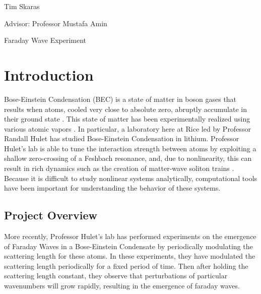 \documentclass[12]{article}
\begin{document}
\begin{flushright}
Tim Skaras

Advisor: Professor Mustafa Amin
\end{flushright}

\begin{center}
{\LARGE Faraday Wave Experiment}
\end{center}

\section{Introduction}

Bose-Einstein Condensation (BEC) is a state of matter in boson gases that results when atoms, cooled very close to absolute zero, abruptly accumulate in their ground state \cite{schroeder1999introduction}. This state of matter has been experimentally realized using various atomic vapors \cite{pethick2008bose}. In particular, a laboratory here at Rice led by Professor Randall Hulet has studied Bose-Einstein Condensation in lithium. Professor Hulet's lab is able to tune the interaction strength between atoms by exploiting a shallow zero-crossing of a Feshbach resonance, and, due to nonlinearity, this can result in rich dynamics such as the creation of matter-wave soliton trains \cite{nguyen2017formation}. Because it is difficult to study nonlinear systems analytically, computational tools have been important for understanding the behavior of these systems.

\subsection{Project Overview}

More recently, Professor Hulet's lab has performed experiments on the emergence of Faraday Waves in a Bose-Einstein Condensate by periodically modulating the scattering length for these atoms. In these experiments, they have modulated the scattering length periodically for a fixed period of time. Then after holding the scattering length constant, they observe that perturbations of particular wavenumbers will grow rapidly, resulting in the emergence of faraday waves.
\end{document}
